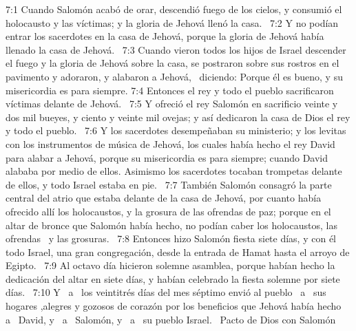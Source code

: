 							7:1 Cuando Salomón acabó de orar, descendió fuego de los cielos, y consumió el holocausto y las víctimas; y la gloria de Jehová llenó la casa.  
							7:2 Y no podían entrar los sacerdotes en la casa de Jehová, porque la gloria de Jehová había llenado la casa de Jehová.  
							7:3 Cuando vieron todos los hijos de Israel descender el fuego y la gloria de Jehová sobre la casa, se postraron sobre sus rostros en el pavimento y adoraron, y alabaron a Jehová,  diciendo: Porque él es bueno, y su misericordia es para siempre. 
							7:4 Entonces el rey y todo el pueblo sacrificaron víctimas delante de Jehová.  
							7:5 Y ofreció el rey Salomón en sacrificio veinte y dos mil bueyes, y ciento y veinte mil ovejas; y así dedicaron la casa de Dios el rey y todo el pueblo.  
							7:6 Y los sacerdotes desempeñaban su ministerio; y los levitas con los instrumentos de música de Jehová, los cuales había hecho el rey David para alabar a Jehová, porque su misericordia es para siempre; cuando David alababa por medio de ellos. Asimismo los sacerdotes tocaban trompetas delante de ellos, y todo Israel estaba en pie.  
							7:7 También Salomón consagró la parte central del atrio que estaba delante de la casa de Jehová, por cuanto había ofrecido allí los holocaustos, y la grosura de las ofrendas de paz; porque en el altar de bronce que Salomón había hecho, no podían caber los holocaustos, las ofrendas  y las grosuras.  
							7:8 Entonces hizo Salomón fiesta siete días, y con él todo Israel, una gran congregación, desde la entrada de Hamat hasta el arroyo de Egipto.  
							7:9 Al octavo día hicieron solemne asamblea, porque habían hecho la dedicación del altar en siete días, y habían celebrado la fiesta solemne por siete días.  
							7:10 Y  a  los veintitrés días del mes séptimo envió al pueblo  a  sus hogares ,alegres y gozosos de corazón por los beneficios que Jehová había hecho  a  David, y  a  Salomón, y  a  su pueblo Israel.  
							Pacto de Dios con Salomón  
							
